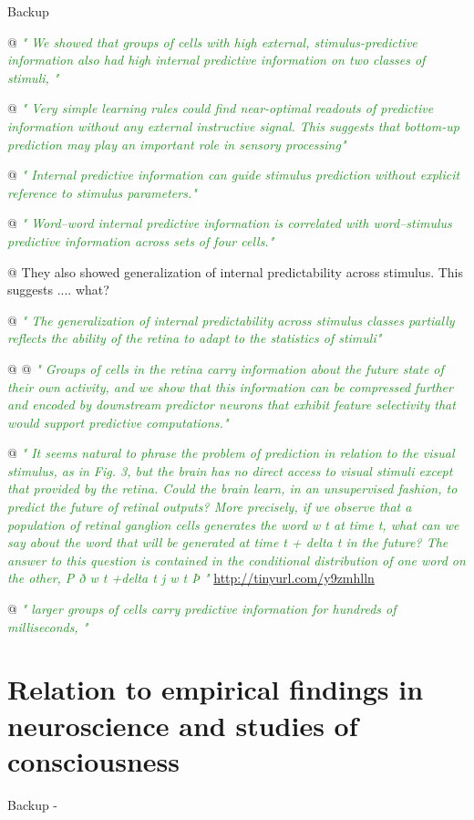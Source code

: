 \documentclass[utf8]{article}
\newenvironment{ants}
			{
			 \begin{easylist}[itemize]
		 	}
			{
			\end{easylist}
			} %
\newcommand{\rewrite}[1]{\textcolor{ForestGreen}{\textit{"#1"}}\newline}
\newenvironment{backup}
    {
        
        \begin{tcolorbox}[enhanced,
            title=-,
            size=small,
            colbacktitle=black!70!white,
            colback=black!10!white,            
            drop fuzzy shadow,
            fontupper=\small,
            boxrule=0.4pt,
            sharp corners]
            Backup
        \end{tcolorbox}
    }
    {
        \begin{tcolorbox}[enhanced,
            halign=flush right,
            halign title=right,
            size=small,
            colbacktitle=black!10!white,
            colback=black!70!white,
            drop fuzzy shadow,
            fontupper=\small,
            boxrule=0.4pt,
            colupper=White,
            sharp corners]
            Backup -
        \end{tcolorbox}    
    }
\begin{document}
\begin{backup}
\begin{ants}
			@ \rewrite{
				We showed that groups of cells with high external, stimulus-predictive information also had high internal predictive information on two classes of stimuli, }

			@ \rewrite{
				Very simple learning rules could find near-optimal readouts of predictive information without any external instructive signal. This suggests that bottom-up prediction may play an important role in sensory processing}

			@ \rewrite{
				Internal predictive information can guide stimulus prediction without explicit reference to stimulus parameters.}

			@ \rewrite{
				Word–word internal predictive information is correlated with word–stimulus predictive information across sets of four cells.}

			@ They also showed generalization of internal predictability across stimulus. This suggests .... what?

			@ \rewrite{
				The generalization of internal predictability across stimulus classes partially reflects the ability of the retina to adapt to the statistics of stimuli}


			@ \cite{Palmer2015}
			@ \rewrite{
				Groups of cells in the retina carry information about the future state of their own activity, and we show that this information can be compressed further and encoded by downstream predictor neurons that exhibit feature selectivity that would support predictive computations.}

			@ \rewrite{
				It seems natural to phrase the problem of prediction in relation to the visual stimulus, as in Fig. 3, but the brain has no direct access to visual stimuli except that provided by the retina. Could the brain learn, in an unsupervised fashion, to predict the future of retinal outputs? More precisely, if we observe that a population of retinal ganglion cells generates the word w t at time t, what can we say about the word that will be generated at time t + delta t in the future? The answer to this question is contained in the conditional distribution of one word on the other, P ð w t +delta t j w t Þ } \url{http://tinyurl.com/y9zmhlln}

			@ \rewrite{
				larger groups of cells carry predictive information for hundreds of milliseconds, }

		\end{ants}




	\section*{Relation to empirical findings in neuroscience and studies of consciousness}


\end{backup}
\end{document}
